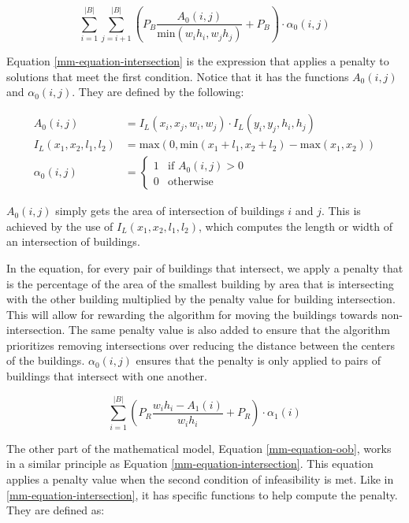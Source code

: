 \begin{equation}\label{mm-equation-intersection}
	\sum_{i=1}^{\left | B \right |}\sum_{j=i + 1}^{\left | B \right |} \left ( P_{B}\frac{A_{0}(i, j)}{\text{min}(w_{i}h_{i}, w_{j}h_{j})} + P_{B} \right ) \cdot \alpha_{0}(i, j)
\end{equation}

Equation \ref{mm-equation-intersection} is the expression that applies a penalty to solutions that meet the first condition. Notice that it has the functions $A_{0}(i, j)$ and $\alpha_{0}(i, j)$. They are defined by the following:

\begin{align}
	A_{0}(i, j) &= I_{L}(x_{i}, x_{j}, w_{i}, w_{j})
	               \cdot I_{L}(y_{i}, y_{j}, h_{i}, h_{j}) \\
	I_{L}(x_{1}, x_{2}, l_{1}, l_{2}) &= \text{max}(0, \text{min}(x_{1} + l_{1}, x_{2} + l_{2}) - \text{max}(x_{1}, x_{2})) \\
    \alpha_{0}(i, j) &=
    \left\{\begin{matrix}
    	1 & \text{if } A_{0}(i, j) > 0 \\ 
    	0 & \text{otherwise}
    \end{matrix}\right.
\end{align}

$A_{0}(i, j)$ simply gets the area of intersection of buildings $i$ and $j$. This is achieved by the use of $I_{L}(x_{1}, x_{2}, l_{1}, l_{2})$, which computes the length or width of an intersection of buildings.

In the equation, for every pair of buildings that intersect, we apply a penalty that is the percentage of the area of the smallest building by area that is intersecting with the other building multiplied by the penalty value for building intersection. This will allow for rewarding the algorithm for moving the buildings towards non-intersection. The same penalty value is also added to ensure that the algorithm prioritizes removing intersections over reducing the distance between the centers of the buildings. $\alpha_{0}(i, j)$ ensures that the penalty is only applied to pairs of buildings that intersect with one another.

\begin{equation}\label{mm-equation-oob}
	\sum_{i=1}^{\left | B \right |}\left( P_{R}\frac{w_{i}h_{i} - A_{1}(i)}{w_{i}h_{i}} + P_{R} \right) \cdot \alpha_{1}(i)
\end{equation}

The other part of the mathematical model, Equation \ref{mm-equation-oob}, works in a similar principle as Equation \ref{mm-equation-intersection}. This equation applies a penalty value when the second condition of infeasibility is met. Like in \ref{mm-equation-intersection}, it has specific functions to help compute the penalty. They are defined as:

